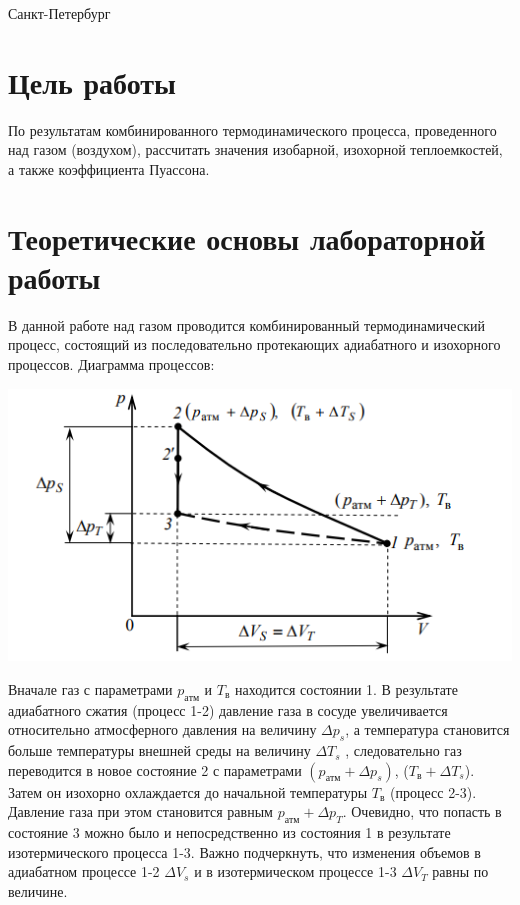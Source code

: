 \documentclass[12pt]{article}
\begin{document}
\par\bigskip\par\bigskip\par\bigskip\par\bigskip\par\bigskip\par\bigskip\par\bigskip\par\bigskip\par\bigskip\par\bigskip     
\begin{center}
\large
Санкт-Петербург
\par{}
\end{center}
\newpage

\section*{Цель работы}
По результатам комбинированного термодинамического процесса, проведенного над газом (воздухом), рассчитать значения изобарной, изохорной теплоемкостей, а также коэффициента Пуассона.
\section*{Теоретические основы лабораторной работы}
В данной работе над газом проводится комбинированный термодинамический процесс, состоящий из последовательно протекающих адиабатного и изохорного процессов. Диаграмма процессов:
\begin{center}
 \includegraphics{1}
 \end{center} 
Вначале газ с параметрами $p_{атм}$ и  $T_{в}$ находится состоянии 1. 
В результате адиабатного сжатия (процесс 1-2) давление газа в сосуде увеличивается относительно атмосферного давления на величину $\Delta p_{s}$, а температура становится больше температуры внешней среды на величину $\Delta T_{s}$ , следовательно газ переводится в новое состояние 2 с параметрами $(p_{атм}+\Delta p_{s})$, ($T_{в}+\Delta T_{s}$). Затем он изохорно охлаждается до начальной температуры $T_{в}$ (процесс 2-3). Давление газа при этом становится равным $p_{атм}+\Delta p_{T}$. Очевидно, что попасть в состояние 3 можно было и непосредственно из состояния 1 в результате изотермического процесса 1-3. Важно подчеркнуть, что изменения объемов в адиабатном процессе 1-2 $\Delta V_{s}$ и в изотермическом процессе 1-3 $\Delta V_{T}$ равны по величине.
\end{document}
